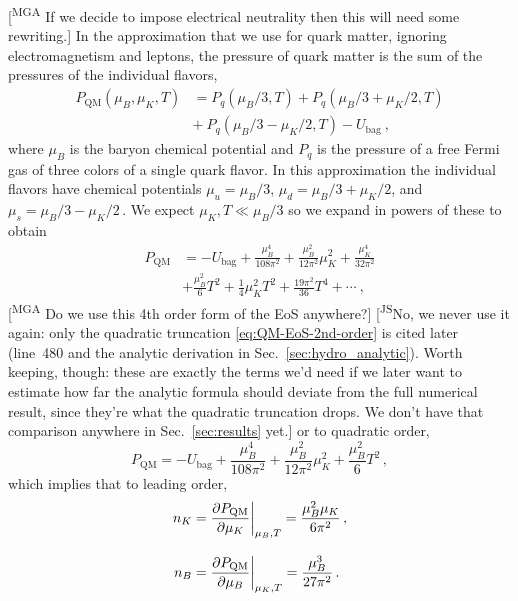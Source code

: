 \documentclass[10pt,superscriptaddress,
amsmath,aps,prc,twocolumn,nofootinbib,floatfix]{revtex4-1}
\newcommand{\mgacom}[1]{\textsf{\color[rgb]{0.8,0,0}[\textsuperscript{MGA} #1]}}
\newcommand{\JScom}[1]{\textsf{\color{violet} [\textsuperscript{JS}#1]}}
\begin{document}
\mgacom{If we decide to impose electrical neutrality then this will need some rewriting.}
In the approximation that we use for quark matter, ignoring electromagnetism and leptons, the pressure of quark matter is the sum of the pressures of the individual flavors,
\begin{equation}
\begin{array}{rl}
 P_\text{QM}(\mu_B,\mu_K,T) &= P_q(\mu_B/3,T)
 + P_q(\mu_B/3{+}\mu_K/2,T)  \\[1ex]
  & +\ P_q(\mu_B/3{-}\mu_K/2,T) - U_\text{bag} \ ,
\end{array}
 \label{eq:QM-bag-EoS}
\end{equation}
where $\mu_B$ is the baryon chemical potential and $P_q$ is the pressure of a free Fermi gas of three colors of a single quark flavor.
In this approximation the individual flavors have chemical potentials $\mu_u=\mu_B/3$, $\mu_d =\mu_B/3 + \mu_K/2$, and $\mu_s= \mu_B/3 - \mu_K/2\,.$
We expect $\mu_K,T \ll \mu_B/3$ so we expand in powers of these to obtain
\begin{equation}
\begin{aligned}
P_{\text{QM}} & =
-U_\text{bag}+\frac{\mu_B^4}{108\pi^2}
+
\frac{\mu_B^2}{12\pi^2}\mu_K^2
+
\frac{\mu_K^4}{32\pi^2}\\[1ex]
& +
\frac{\mu_B^2}{6}T^2
+
\frac{1}{4}\mu_K^2T^2
+
\frac{19\pi^2}{36}T^4
+\cdots\ ,
\end{aligned}
\label{eq:Qm-EoS-4th-order}
\end{equation} 
\mgacom{Do we use this 4th order form of the EoS anywhere?}\JScom{No, we never use it again: only the quadratic truncation \eqref{eq:QM-EoS-2nd-order} is cited later (line~480 and the analytic derivation in Sec.~\ref{sec:hydro_analytic}). Worth keeping, though: these are exactly the terms we'd need if we later want to estimate how far the analytic formula should deviate from the full numerical result, since they're what the quadratic truncation drops. We don't have that comparison anywhere in Sec.~\ref{sec:results} yet.}
or to quadratic order,
\begin{equation}
 P_{\text{QM}} = -U_\text{bag}+\frac{\mu_B^4}{108\pi^2}
+
\frac{\mu_B^2}{12\pi^2}\mu_K^2
 +\frac{\mu_B^2}{6} T^2\,,
 \label{eq:QM-EoS-2nd-order}
\end{equation}
which implies that to leading order,
\begin{align}
 n_K & =\dfrac{\partial P_{\rm QM}}{\partial\mu_K}\biggr|_{\mu_B,T} =
\frac{\mu_B^2\mu_K}{6\pi^2}\,,
\label{eq:nK-approx}
 \\[2ex]
 n_B &=\dfrac{\partial P_{\rm QM}}{\partial\mu_B}\biggr|_{\mu_K,T} = \dfrac{\mu_B^3}{27\pi^2} 
 \,.
 \label{eq:nB-approx}
\end{align}
\end{document}
